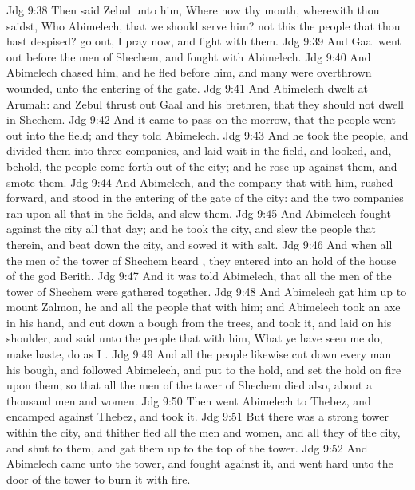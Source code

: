 \vs Jdg 9:38 Then said Zebul unto him, Where  now thy mouth, wherewith thou saidst, Who  Abimelech, that we should serve him?  not this the people that thou hast despised? go out, I pray now, and fight with them.
\vs Jdg 9:39 And Gaal went out before the men of Shechem, and fought with Abimelech.
\vs Jdg 9:40 And Abimelech chased him, and he fled before him, and many were overthrown  wounded,  unto the entering of the gate.
\vs Jdg 9:41 And Abimelech dwelt at Arumah: and Zebul thrust out Gaal and his brethren, that they should not dwell in Shechem.
\vs Jdg 9:42 And it came to pass on the morrow, that the people went out into the field; and they told Abimelech.
\vs Jdg 9:43 And he took the people, and divided them into three companies, and laid wait in the field, and looked, and, behold, the people  come forth out of the city; and he rose up against them, and smote them.
\vs Jdg 9:44 And Abimelech, and the company that  with him, rushed forward, and stood in the entering of the gate of the city: and the two  companies ran upon all  that  in the fields, and slew them.
\vs Jdg 9:45 And Abimelech fought against the city all that day; and he took the city, and slew the people that  therein, and beat down the city, and sowed it with salt.
\vs Jdg 9:46 And when all the men of the tower of Shechem heard , they entered into an hold of the house of the god Berith.
\vs Jdg 9:47 And it was told Abimelech, that all the men of the tower of Shechem were gathered together.
\vs Jdg 9:48 And Abimelech gat him up to mount Zalmon, he and all the people that  with him; and Abimelech took an axe in his hand, and cut down a bough from the trees, and took it, and laid  on his shoulder, and said unto the people that  with him, What ye have seen me do, make haste,  do as I .
\vs Jdg 9:49 And all the people likewise cut down every man his bough, and followed Abimelech, and put  to the hold, and set the hold on fire upon them; so that all the men of the tower of Shechem died also, about a thousand men and women.
\vs Jdg 9:50 Then went Abimelech to Thebez, and encamped against Thebez, and took it.
\vs Jdg 9:51 But there was a strong tower within the city, and thither fled all the men and women, and all they of the city, and shut  to them, and gat them up to the top of the tower.
\vs Jdg 9:52 And Abimelech came unto the tower, and fought against it, and went hard unto the door of the tower to burn it with fire.
